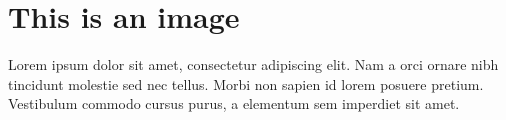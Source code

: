 \chapter{This is an image}
\label{app:appendix1}

Lorem ipsum dolor sit amet, consectetur adipiscing elit. Nam a orci ornare nibh tincidunt molestie sed nec tellus. Morbi non sapien id lorem posuere pretium. Vestibulum commodo cursus purus, a elementum sem imperdiet sit amet.

